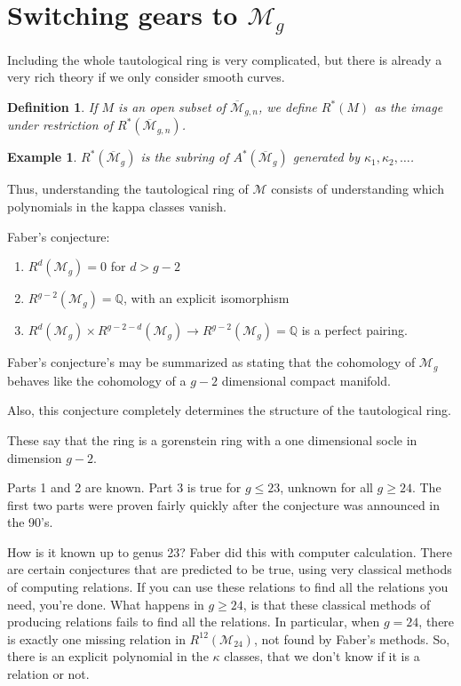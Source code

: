 \documentclass{amsart}
\newtheorem{definition}{Definition}
\newtheorem{example}{Example}
\newcommand{\Mbar}{\overline{\mathcal{M}}}
\newcommand{\M}{\mathcal{M}}
\newcommand{\Q}{\mathbb{Q}}
\begin{document}
\section{Switching gears to $\M_g$ }
Including the whole tautological ring is very complicated, but there is already a very rich theory if we only consider smooth curves.

\begin{definition}
If $M$ is an open subset of $\Mbar_{g,n}$, we define $R^*(M)$ as the image under restriction of $R^*(\Mbar_{g,n})$.
\end{definition}

\begin{example}
$R^*(\Mbar_g)$ is the subring of $A^*(\Mbar_g)$ generated by $\kappa_1,\kappa_2,\dots$.
\end{example}

Thus, understanding the tautological ring of $\M$ consists of understanding which polynomials in the kappa classes vanish.

Faber's conjecture:
\begin{enumerate}
\item $R^d(\M_g)=0$ for $d>g-2$
\item $R^{g-2}(\M_g)=\Q$, with an explicit isomorphism
\item $R^d(\M_g)\times R^{g-2-d}(\M_g)\to R^{g-2}(\M_g)=\Q$ is a perfect pairing.
\end{enumerate}
Faber's conjecture's may be summarized as stating that the cohomology of $\M_g$ behaves like the cohomology of a $g-2$ dimensional compact manifold.

Also, this conjecture completely determines the structure of the tautological ring. 

These say that the ring is a gorenstein ring with a one dimensional socle in dimension $g-2$.


Parts 1 and 2 are known.  Part 3 is true for $g\leq 23$, unknown for all $g\geq 24$.  The first two parts were proven fairly quickly after the conjecture was announced in the 90's.  

How is it known up to genus 23?  Faber did this with computer calculation.  There are certain conjectures that are predicted to be true, using very classical methods of computing relations.  If you can use these relations to find all the relations you need, you're done.  What happens in $g\geq 24$, is that these classical methods of producing relations fails to find all the relations.  In particular, when $g=24$, there is exactly one missing relation in $R^12(\M_24)$, not found by Faber's methods.  So, there is an explicit polynomial in the $\kappa$ classes, that we don't know if it is a relation or not.
\end{document}
